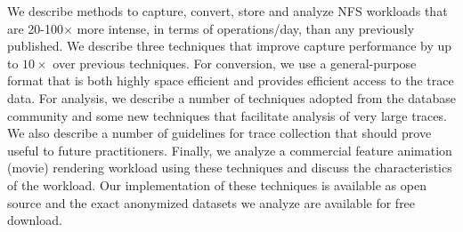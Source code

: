 We describe methods to capture, convert, store and analyze NFS
workloads that are 20-100$\times$ more intense, in terms of
operations/day, than any previously published.
%
We describe three techniques that improve capture performance by up to
$10\times$ over previous techniques.
%
For conversion, we use a general-purpose format that is both highly
space efficient and provides efficient access to the trace data.
%
For
analysis, we describe a number of techniques adopted from the
database community and some new techniques that facilitate analysis of 
very large traces.
%
We also describe a number of guidelines for trace collection that should
prove useful to future practitioners.
%
Finally, we analyze a commercial feature
animation (movie) rendering workload using these techniques and discuss the
characteristics of the workload.
%
Our implementation of these techniques is available as open source
and the exact anonymized datasets we analyze are available for free download.


